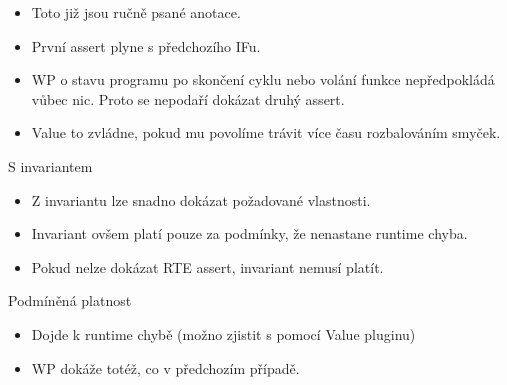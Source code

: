 \documentclass[11pt]{beamer}
\begin{document}
\begin{frame}
	\lstExIIwpItryI
	\begin{itemize}
		\item Toto již jsou ručně psané anotace.
		\item První assert plyne s předchozího IFu.
		\item WP o stavu programu po skončení cyklu nebo volání funkce nepředpokládá vůbec nic. Proto se nepodaří dokázat druhý assert.
		\pause \item Value to zvládne, pokud mu povolíme trávit více času rozbalováním smyček.
	\end{itemize}
\end{frame}


\begin{frame}{S invariantem}
	\lstExIIwpItryII
	\begin{itemize}
			\item Z invariantu lze snadno dokázat požadované vlastnosti.
			\item Invariant ovšem platí pouze za podmínky, že nenastane runtime chyba.
			\item Pokud nelze dokázat RTE assert, invariant nemusí platít.
	\end{itemize}
\end{frame}


\begin{frame}{Podmíněná platnost}
	\lstExIIwpItryIII
	\begin{itemize}
		\item Dojde k runtime chybě (možno zjistit s pomocí Value pluginu)
		\item WP dokáže totéž, co v předchozím případě.
	\end{itemize}
\end{frame}
\end{document}
